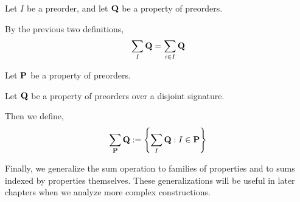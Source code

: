 \begin{note}
  Let $I$ be a preorder, and let $\mathbf{Q}$ be a property of preorders.

  By the previous two definitions,
  \[
    \sum_{I}{\mathbf{Q}} = \sum_{i \in I}{\mathbf{Q}}
  \]
\end{note}

\begin{definition}
  Let $\mathbf{P}$ be a property of preorders.

  Let $\mathbf{Q}$ be a property of preorders over a disjoint signature.

  Then we define,
  \[
    \sum_{\mathbf{P}}{\mathbf{Q}} := \left\{ {\sum_{I}{\mathbf{Q}} : I \in \mathbf{P}} \right\}
  \]
\end{definition}

Finally, we generalize the sum operation to families of properties and to sums indexed by properties themselves. These
generalizations will be useful in later chapters when we analyze more complex constructions.
